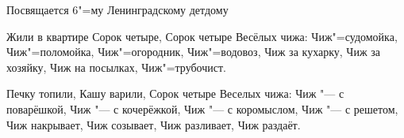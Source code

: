 \begin{flushright}

Посвящается 6"=му Ленинградскому детдому 
\end{flushright}


\noindent\hspace*{5cm}%
\begin{minipage}[t]{\dimexpr\linewidth-5cm}
     Жили в квартире \newline
               Сорок четыре, \newline 
               Сорок четыре \newline
               Весёлых чижа: \newline
               Чиж"=судомойка, \newline
               Чиж"=поломойка, \newline
               Чиж"=огородник, \newline
               Чиж"=водовоз, \newline
               Чиж за кухарку,\newline 
               Чиж за хозяйку, \newline
               Чиж на посылках, \newline
               Чиж"=трубочист. \newline
\end{minipage}

\noindent\hspace*{6cm}%
\begin{minipage}[t]{\dimexpr\linewidth-6cm}
               Печку топили, \newline
               Кашу варили, \newline
               Сорок четыре \newline
               Веселых чижа: \newline
               Чиж "--- с поварёшкой, \newline
               Чиж "--- с кочерёжкой, \newline
               Чиж "--- с коромыслом, \newline
               Чиж "--- с решетом, \newline
               Чиж накрывает, \newline
               Чиж созывает, \newline
               Чиж разливает, \newline
               Чиж раздаёт. \newline
\end{minipage}

